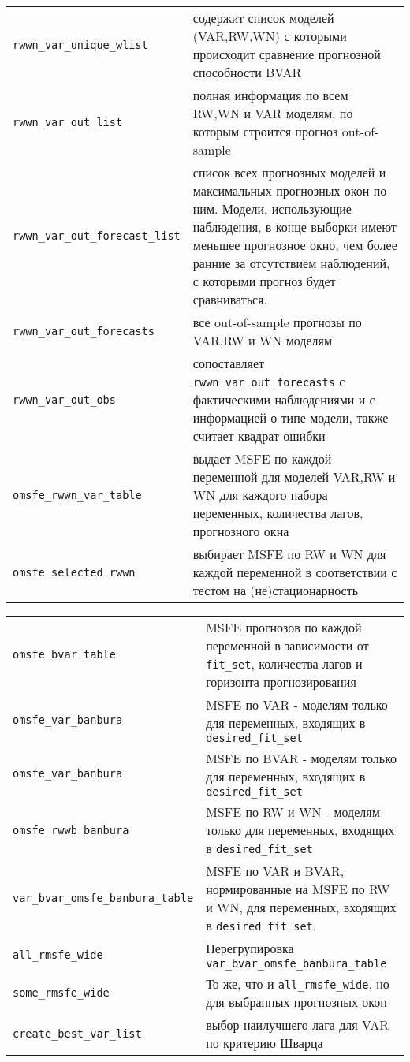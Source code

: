 \documentclass[11pt]{article} %
\begin{document}
\begin{center}
\begin{table}[h!]
\begin{tabular}{lp{10cm}}
\verb|rwwn_var_unique_wlist|& содержит список моделей (VAR,RW,WN) с которыми происходит сравнение прогнозной способности BVAR\\
\verb|rwwn_var_out_list|& полная информация по всем RW,WN и VAR моделям, по которым строится прогноз out-of-sample\\ 
\verb|rwwn_var_out_forecast_list|& список всех прогнозных моделей и максимальных прогнозных окон по ним. Модели, использующие наблюдения, в конце выборки имеют меньшее прогнозное окно, чем более ранние за отсутствием наблюдений, с которыми прогноз будет сравниваться. \\
\verb|rwwn_var_out_forecasts|& все out-of-sample прогнозы по VAR,RW и WN моделям \\
\verb|rwwn_var_out_obs|& сопоставляет \verb|rwwn_var_out_forecasts| с фактическими наблюдениями и с информацией о типе модели, также считает квадрат ошибки\\
\verb|omsfe_rwwn_var_table|& выдает MSFE по каждой переменной для моделей VAR,RW и WN для каждого набора переменных, количества лагов, прогнозного окна\\
\verb|omsfe_selected_rwwn|& выбирает MSFE по RW и WN для каждой переменной в соответствии с тестом на (не)стационарность\\
\midrule  
\end{tabular}
\end{table}
\end{center}
\newpage
\begin{center}
\begin{table}[h!]
\begin{tabular}{lp{10cm}}
\midrule 
\verb|omsfe_bvar_table|& MSFE прогнозов по каждой переменной в зависимости от \verb|fit_set|, количества лагов и горизонта прогнозирования\\
\verb|omsfe_var_banbura|& MSFE по VAR - моделям только для переменных, входящих в \verb|desired_fit_set|\\
\verb|omsfe_var_banbura|& MSFE по BVAR - моделям только для переменных, входящих в \verb|desired_fit_set|\\
\verb|omsfe_rwwb_banbura|& MSFE по RW и WN - моделям только для переменных, входящих в \verb|desired_fit_set|\\
\midrule 
\verb|var_bvar_omsfe_banbura_table|& MSFE по VAR и BVAR, нормированные на MSFE по RW и WN, для переменных, входящих в \verb|desired_fit_set|. \\ 
\verb|all_rmsfe_wide| & Перегрупировка \verb|var_bvar_omsfe_banbura_table|\\
\verb|some_rmsfe_wide|& То же, что и \verb|all_rmsfe_wide|, но для выбранных прогнозных окон\\
\verb|create_best_var_list|& выбор наилучшего лага для VAR по критерию Шварца\\
\bottomrule


\end{tabular}
\end{table}
\end{center}
\end{document}
